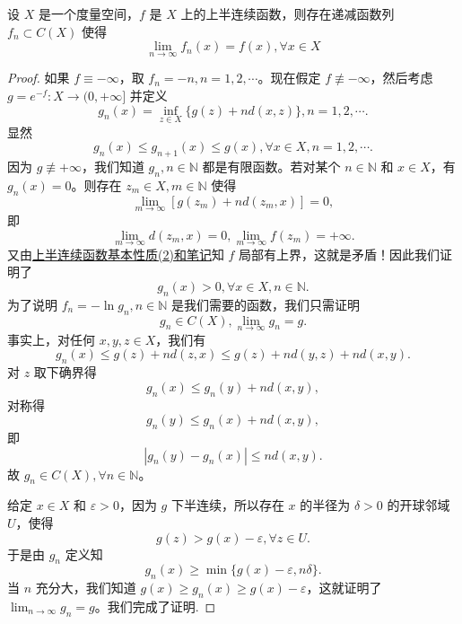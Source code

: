 \documentclass[../../main.tex]{subfiles}
\begin{document}
\begin{theorem}[半连续函数逼近定理]\label{theorem:半连续函数逼近定理}
设 \(X\) 是一个度量空间，\(f\) 是 \(X\) 上的上半连续函数，则存在递减函数列 \(f_{n} \subset C(X)\) 使得
\[
\lim_{n \to \infty} f_{n}(x)=f(x),\forall x \in X
\]
\end{theorem}
\begin{proof}
如果 \(f\equiv -\infty\)，取 \(f_{n}=-n,n = 1,2,\cdots\)。现在假定 \(f\not\equiv -\infty\)，然后考虑 \(g = e^{-f}:X\to(0,+\infty]\) 并定义
\[
g_{n}(x)=\inf_{z\in X}\{g(z)+nd(x,z)\},n = 1,2,\cdots.
\]
显然
\[
g_{n}(x)\leq g_{n + 1}(x)\leq g(x),\forall x\in X,n = 1,2,\cdots.
\]
因为 \(g\not\equiv+\infty\)，我们知道 \(g_{n},n\in\mathbb{N}\) 都是有限函数。若对某个 \(n\in\mathbb{N}\) 和 \(x\in X\)，有 \(g_{n}(x)=0\)。则存在 \(z_{m}\in X,m\in\mathbb{N}\) 使得
\[
\lim_{m\to\infty}[g(z_{m})+nd(z_{m},x)] = 0,
\]
即
\[
\lim_{m\to\infty}d(z_{m},x)=0,\lim_{m\to\infty}f(z_{m})=+\infty.
\]
又由\hyperref[proposition:半连续函数基本性质]{上半连续函数基本性质(2)和笔记}知 \(f\) 局部有上界，这就是矛盾！因此我们证明了
\[
g_{n}(x)>0,\forall x\in X,n\in\mathbb{N}.
\]
为了说明 \(f_{n}=-\ln g_{n},n\in\mathbb{N}\) 是我们需要的函数，我们只需证明
\[
g_{n}\in C(X),\lim_{n\to\infty}g_{n}=g.
\]
事实上，对任何 \(x,y,z\in X\)，我们有
\[
g_{n}(x)\leq g(z)+nd(z,x)\leq g(z)+nd(y,z)+nd(x,y).
\]
对 \(z\) 取下确界得
\[
g_{n}(x)\leq g_{n}(y)+nd(x,y),
\]
对称得
\[
g_{n}(y)\leq g_{n}(x)+nd(x,y),
\]
即
\[
|g_{n}(y)-g_{n}(x)|\leq nd(x,y).
\]
故 \(g_{n}\in C(X),\forall n\in\mathbb{N}\)。

给定 \(x\in X\) 和 \(\varepsilon>0\)，因为 \(g\) 下半连续，所以存在 \(x\) 的半径为 \(\delta>0\) 的开球邻域 \(U\)，使得
\[
g(z)>g(x)-\varepsilon,\forall z\in U.
\]
于是由 \(g_{n}\) 定义知
\[
g_{n}(x)\geq\min\{g(x)-\varepsilon,n\delta\}.
\]
当 \(n\) 充分大，我们知道 \(g(x)\geq g_{n}(x)\geq g(x)-\varepsilon\)，这就证明了 \(\lim_{n\to\infty}g_{n}=g\)。我们完成了证明.
\end{proof}
\end{document}
